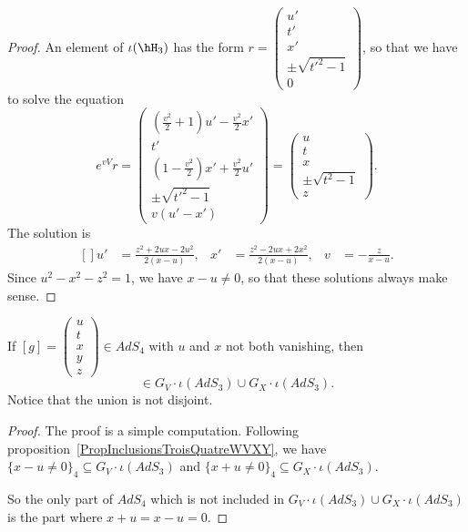 \begin{proof}
An element of $\iota(\hH_3)$ has the form
$r=\begin{pmatrix}
	u'	\\
	t'	\\
	x'	\\
	\pm\sqrt{t'^2-1}	\\
	0
\end{pmatrix}$,
so that we have to solve the equation
\begin{equation}
	 e^{vV}r=\begin{pmatrix}
	\left( \frac{ v^2 }{ 2 }+1 \right)u'-\frac{ v^2 }{ 2 }x'	\\
	t'	\\
	\left( 1-\frac{ v^2 }{ 2 } \right)x'+\frac{ v^2 }{ 2 }u'	\\
	\pm\sqrt{t'^2-1}	\\
	v(u'-x')
\end{pmatrix}
=
\begin{pmatrix}
	u	\\
	t	\\
	x	\\
	\pm\sqrt{t^2-1}	\\
	z
\end{pmatrix}.
\end{equation}
The solution is
\begin{equation}
	\begin{aligned}[]
		u'&=\frac{ z^2+2ux-2u^2 }{ 2(x-u) },&x'&=\frac{ z^2-2ux+2x^2 }{ 2(x-u) },&v&=-\frac{ z }{ x-u }.
	\end{aligned}
\end{equation}
Since $u^2-x^2-z^2=1$, we have $x-u\neq 0$, so that these solutions always make sense.
\end{proof}

\begin{lemma}
If $[g]=\begin{pmatrix}
	u	\\
	t	\\
	x	\\
	y	\\
	z
\end{pmatrix}\in AdS_4$ with $u$ and $x$ not both vanishing, then
\begin{equation}
	[g]\in G_V\cdot\iota(AdS_3)\cup G_X\cdot \iota(AdS_3).
\end{equation}
Notice that the union is not disjoint.
\end{lemma}

\begin{proof}
The proof is a simple computation. Following proposition~\ref{PropInclusionsTroisQuatreWVXY}, we have $\{ x-u\neq 0 \}_4\subseteq G_V\cdot\iota(AdS_3)$ and $\{ x+u\neq 0 \}_4\subseteq G_X\cdot\iota(AdS_3)$.

So the only part of $AdS_4$ which is not included in $G_V\cdot \iota(AdS_3)\cup G_X\cdot\iota(AdS_3)$ is the part where $x+u=x-u=0$.
\end{proof}

